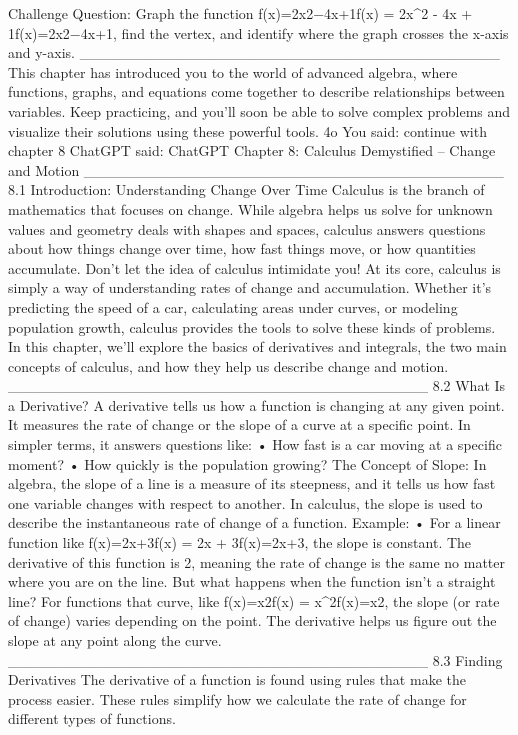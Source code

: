 Challenge Question:
Graph the function f(x)=2x2−4x+1f(x) = 2x^2 - 4x + 1f(x)=2x2−4x+1, find the vertex, and identify where the graph crosses the x-axis and y-axis.
________________________________________
This chapter has introduced you to the world of advanced algebra, where functions, graphs, and equations come together to describe relationships between variables. Keep practicing, and you’ll soon be able to solve complex problems and visualize their solutions using these powerful tools.
4o
You said:
continue with chapter 8
ChatGPT said:
ChatGPT
Chapter 8: Calculus Demystified – Change and Motion
________________________________________
8.1 Introduction: Understanding Change Over Time
Calculus is the branch of mathematics that focuses on change. While algebra helps us solve for unknown values and geometry deals with shapes and spaces, calculus answers questions about how things change over time, how fast things move, or how quantities accumulate.
Don’t let the idea of calculus intimidate you! At its core, calculus is simply a way of understanding rates of change and accumulation. Whether it’s predicting the speed of a car, calculating areas under curves, or modeling population growth, calculus provides the tools to solve these kinds of problems.
In this chapter, we’ll explore the basics of derivatives and integrals, the two main concepts of calculus, and how they help us describe change and motion.
________________________________________
8.2 What Is a Derivative?
A derivative tells us how a function is changing at any given point. It measures the rate of change or the slope of a curve at a specific point. In simpler terms, it answers questions like:
•	How fast is a car moving at a specific moment?
•	How quickly is the population growing?
The Concept of Slope:
In algebra, the slope of a line is a measure of its steepness, and it tells us how fast one variable changes with respect to another. In calculus, the slope is used to describe the instantaneous rate of change of a function.
Example:
•	For a linear function like f(x)=2x+3f(x) = 2x + 3f(x)=2x+3, the slope is constant. The derivative of this function is 2, meaning the rate of change is the same no matter where you are on the line.
But what happens when the function isn’t a straight line? For functions that curve, like f(x)=x2f(x) = x^2f(x)=x2, the slope (or rate of change) varies depending on the point. The derivative helps us figure out the slope at any point along the curve.
________________________________________
8.3 Finding Derivatives
The derivative of a function is found using rules that make the process easier. These rules simplify how we calculate the rate of change for different types of functions.

